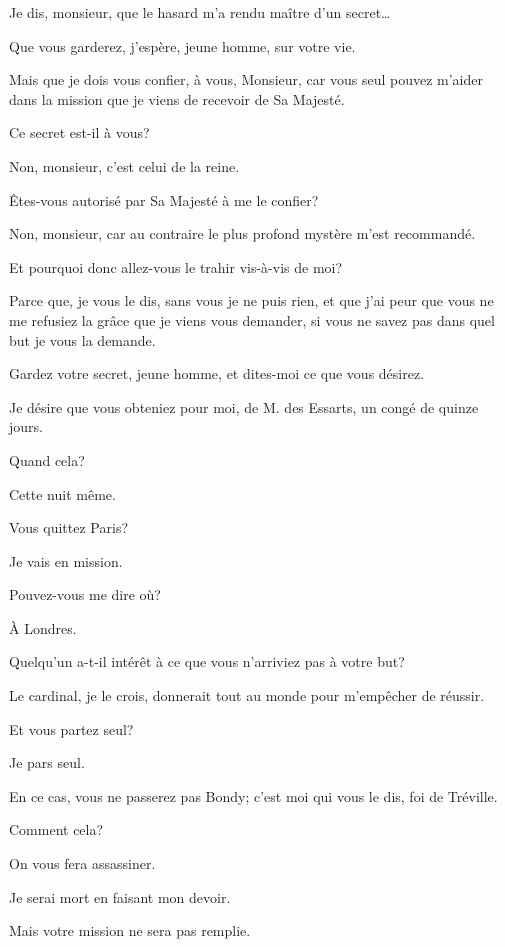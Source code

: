 \speak  Je dis, monsieur, que le hasard m'a rendu maître d'un secret\dots 

\speak  Que vous garderez, j'espère, jeune homme, sur votre vie. 

\speak  Mais que je dois vous confier, à vous, Monsieur, car vous seul pouvez m'aider dans la mission que je viens de recevoir de Sa Majesté. 

\speak  Ce secret est-il à vous? 

\speak  Non, monsieur, c'est celui de la reine. 

\speak  Êtes-vous autorisé par Sa Majesté à me le confier? 

\speak  Non, monsieur, car au contraire le plus profond mystère m'est recommandé. 

\speak  Et pourquoi donc allez-vous le trahir vis-à-vis de moi? 

\speak  Parce que, je vous le dis, sans vous je ne puis rien, et que j'ai peur que vous ne me refusiez la grâce que je viens vous demander, si vous ne savez pas dans quel but je vous la demande. 

\speak  Gardez votre secret, jeune homme, et dites-moi ce que vous désirez. 

\speak  Je désire que vous obteniez pour moi, de M. des Essarts, un congé de quinze jours. 

\speak  Quand cela? 

\speak  Cette nuit même. 

\speak  Vous quittez Paris? 

\speak  Je vais en mission. 

\speak  Pouvez-vous me dire où? 

\speak  À Londres. 

\speak  Quelqu'un a-t-il intérêt à ce que vous n'arriviez pas à votre but? 

\speak  Le cardinal, je le crois, donnerait tout au monde pour m'empêcher de réussir. 

\speak  Et vous partez seul? 

\speak  Je pars seul. 

\speak  En ce cas, vous ne passerez pas Bondy; c'est moi qui vous le dis, foi de Tréville. 

\speak  Comment cela? 

\speak  On vous fera assassiner. 

\speak  Je serai mort en faisant mon devoir. 

\speak  Mais votre mission ne sera pas remplie. 

